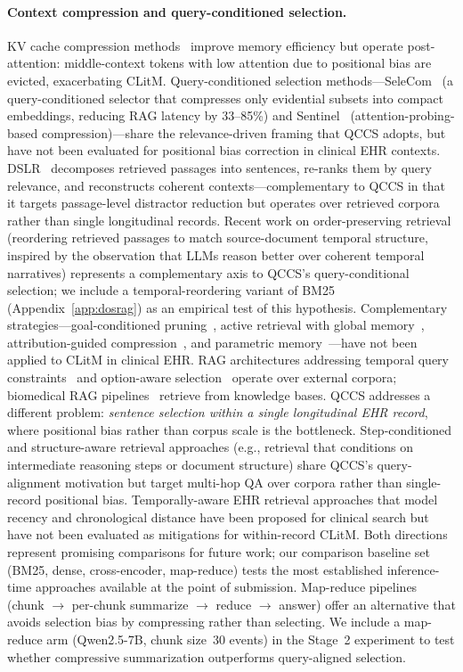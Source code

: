 \documentclass{article}
\begin{document}
\paragraph{Context compression and query-conditioned selection.}
KV cache compression methods~\cite{zhang2023h2o,li2024snapkv,pan2024llmlingua2,%
bui2025cachewhat,zhou2024dynamickv} improve memory efficiency but operate
post-attention: middle-context tokens with low attention due to positional bias
are evicted, exacerbating CLitM. Query-conditioned selection methods---SeleCom~\cite{liu2026selecom} (a
query-conditioned selector that compresses only evidential subsets into
compact embeddings, reducing RAG latency by 33--85\%) and
Sentinel~\cite{zhang2025sentinel} (attention-probing-based compression)---share
the relevance-driven framing that QCCS adopts, but have not been evaluated for
positional bias correction in clinical EHR contexts.
DSLR~\cite{xu2024dslr} decomposes retrieved passages into sentences, re-ranks
them by query relevance, and reconstructs coherent contexts---complementary to
QCCS in that it targets passage-level distractor reduction but operates over
retrieved corpora rather than single longitudinal records.
Recent work on order-preserving retrieval (reordering retrieved passages to match
source-document temporal structure, inspired by the observation that LLMs reason
better over coherent temporal narratives) represents a complementary axis to
QCCS's query-conditional selection; we include a temporal-reordering variant of
BM25 (Appendix~\ref{app:dosrag}) as an empirical test of this hypothesis.
Complementary strategies---goal-conditioned pruning~\cite{wang2026swepruner}, active retrieval with global memory~\cite{qian2025memorag}, attribution-guided compression~\cite{gao2026aif}, and parametric memory~\cite{lu2026locas}---have not been applied to CLitM in clinical EHR.
RAG architectures addressing temporal query constraints~\cite{zhang2024mrag} and option-aware selection~\cite{singh2025oadr} operate over external corpora; biomedical RAG pipelines~\cite{stuhlmann2025biomedrag} retrieve from knowledge bases.
QCCS addresses a different problem: \emph{sentence selection within a single longitudinal EHR record}, where positional bias rather than corpus scale is the bottleneck.
Step-conditioned and structure-aware retrieval approaches (e.g., retrieval that conditions on intermediate reasoning steps or document structure) share QCCS's query-alignment motivation but target multi-hop QA over corpora rather than single-record positional bias. Temporally-aware EHR retrieval approaches that model recency and chronological distance have been proposed for clinical search but have not been evaluated as mitigations for within-record CLitM. Both directions represent promising comparisons for future work; our comparison baseline set (BM25, dense, cross-encoder, map-reduce) tests the most established inference-time approaches available at the point of submission.
Map-reduce pipelines (chunk $\to$ per-chunk summarize $\to$ reduce $\to$ answer)
offer an alternative that avoids selection bias by compressing rather than selecting.
We include a map-reduce arm (Qwen2.5-7B, chunk size~30 events) in the Stage~2
experiment to test whether compressive summarization outperforms query-aligned selection.
\end{document}
